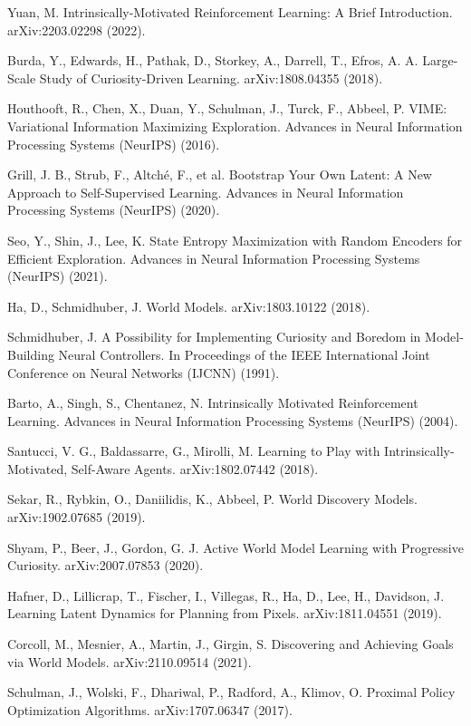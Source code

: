 \begin{thebibliography}{99}
   Yuan, M.
   Intrinsically-Motivated Reinforcement Learning: A Brief Introduction.
   arXiv:2203.02298 (2022).

   Burda, Y., Edwards, H., Pathak, D., Storkey, A., Darrell, T., Efros, A. A.
   Large-Scale Study of Curiosity-Driven Learning.
   arXiv:1808.04355 (2018).

   Houthooft, R., Chen, X., Duan, Y., Schulman, J., Turck, F., Abbeel, P.
   VIME: Variational Information Maximizing Exploration.
   Advances in Neural Information Processing Systems (NeurIPS) (2016).

   Grill, J. B., Strub, F., Altché, F., et al.
   Bootstrap Your Own Latent: A New Approach to Self-Supervised Learning.
   Advances in Neural Information Processing Systems (NeurIPS) (2020).

   Seo, Y., Shin, J., Lee, K.
   State Entropy Maximization with Random Encoders for Efficient Exploration.
   Advances in Neural Information Processing Systems (NeurIPS) (2021).

   Ha, D., Schmidhuber, J.
   World Models.
   arXiv:1803.10122 (2018).

   Schmidhuber, J.
   A Possibility for Implementing Curiosity and Boredom in Model-Building Neural Controllers.
   In Proceedings of the IEEE International Joint Conference on Neural Networks (IJCNN) (1991).

   Barto, A., Singh, S., Chentanez, N.
   Intrinsically Motivated Reinforcement Learning.
   Advances in Neural Information Processing Systems (NeurIPS) (2004).

   Santucci, V. G., Baldassarre, G., Mirolli, M.
   Learning to Play with Intrinsically-Motivated, Self-Aware Agents.
   arXiv:1802.07442 (2018).

   Sekar, R., Rybkin, O., Daniilidis, K., Abbeel, P.
   World Discovery Models.
   arXiv:1902.07685 (2019).

   Shyam, P., Beer, J., Gordon, G. J.
   Active World Model Learning with Progressive Curiosity.
   arXiv:2007.07853 (2020).

   Hafner, D., Lillicrap, T., Fischer, I., Villegas, R., Ha, D., Lee, H., Davidson, J.
   Learning Latent Dynamics for Planning from Pixels.
   arXiv:1811.04551 (2019).

   Corcoll, M., Mesnier, A., Martin, J., Girgin, S.
   Discovering and Achieving Goals via World Models.
   arXiv:2110.09514 (2021).

   Schulman, J., Wolski, F., Dhariwal, P., Radford, A., Klimov, O.
   Proximal Policy Optimization Algorithms.
   arXiv:1707.06347 (2017).

\end{thebibliography}
